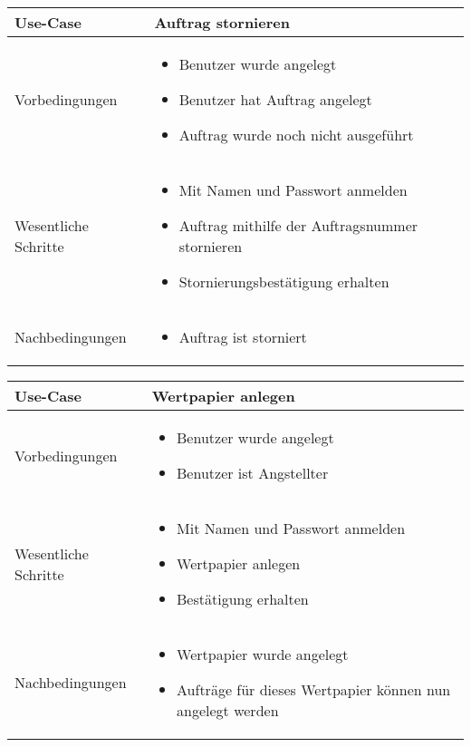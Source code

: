 \documentclass[12pt, a4paper, titlepage]{article}
\begin{document}
\begin{tabular}{|p{}|p{}|}
	\hline
	Use-Case & Auftrag stornieren \\
	\hline
	Vorbedingungen &
		\begin{itemize}
			\item Benutzer wurde angelegt
			\item Benutzer hat Auftrag angelegt
			\item Auftrag wurde noch nicht ausgeführt
		\end{itemize} \\
	\hline
	Wesentliche Schritte &
		\begin{itemize}
			\item Mit Namen und Passwort anmelden
			\item Auftrag mithilfe der Auftragsnummer stornieren
			\item Stornierungsbestätigung erhalten
		\end{itemize} \\
	\hline
	Nachbedingungen &
		\begin{itemize}
			\item Auftrag ist storniert
		\end{itemize} \\
	\hline
\end{tabular}\par

\begin{tabular}{|p{}|p{}|}
	\hline
	Use-Case & Wertpapier anlegen \\
	\hline
	Vorbedingungen & 
		\begin{itemize}
			\item Benutzer wurde angelegt
			\item Benutzer ist Angstellter
		\end{itemize} \\
	\hline
	Wesentliche Schritte &
		\begin{itemize}
			\item Mit Namen und Passwort anmelden
			\item Wertpapier anlegen
			\item Bestätigung erhalten
		\end{itemize} \\
	\hline
	Nachbedingungen & 
		\begin{itemize}
			\item Wertpapier wurde angelegt
			\item Aufträge für dieses Wertpapier können nun angelegt werden
		\end{itemize} \\
	\hline
\end{tabular}\par
\end{document}
